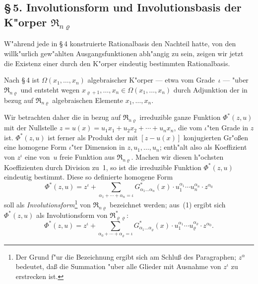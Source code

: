 \documentclass[11pt,a4paper]{article}
\begin{document}
\subsection*{\S\,5. Involutionsform und Involutionsbasis der K"{o}rper $\mathfrak{R}_{n\varrho}$}

W"{a}hrend jede in \S\,4 konstruierte Rationalbasis den Nachteil hatte,
von den willk"{u}rlich gew"{a}hlten Ausgangsfunktionen abh"{a}ngig zu sein, zeigen
wir jetzt die Existenz einer durch den K"{o}rper eindeutig bestimmten
Rationalbasis.

Nach \S\,4 ist $\Omega(x_{1},\dots,x_{n})$ algebraischer K"{o}rper --- etwa vom Grade~$\iota$ ---
"{u}ber $\mathfrak{R}_{n\varrho}$ und entsteht wegen
$x_{\varrho+1},\dots,x_{n}\in\Omega(x_{1},\dots,x_{n})$
durch Adjunktion der in bezug auf $\mathfrak{R}_{n\varrho}$ algebraischen Elemente $x_{1},\dots,x_{n}$.

Wir betrachten daher die in bezug auf $\mathfrak{R}_{n\varrho}$ irreduzible ganze Funktion
$\Phi^{*}(z,u)$ mit der Nullstelle
$z=u(x)=u_{1}x_{1}+u_{2}x_{2}+\cdots+u_{n}x_{n}$,
die vom $\iota$"{t}en Grade in $z$ ist. $\Phi^{*}(z,u)$ ist ferner als Produkt der mit
$[z-u(x)]$ konjugierten Gr"{o}\ss{}en eine homogene Form $\iota$"{t}er Dimension in
$z,u_{1},\dots,u_{n}$; enth"{a}lt also als Koeffizient von $z^{\iota}$ eine von~$u$ freie Funktion
aus $\mathfrak{R}_{n\varrho}$. Machen wir diesen h"{o}chsten Koeffizienten durch Division zu~1,
so ist die irreduzible Funktion $\Phi^{*}(z,u)$ eindeutig bestimmt. Diese so
definierte homogene Form
\begin{equation}
\Phi^{*}(z,u)=z^{\iota}+\sum_{\alpha_{1}+\cdots+\alpha_{n}=\iota}
G_{\alpha_{1}\dots\alpha_{n}}^{*}(x)\cdot u_{1}^{\alpha_{1}}\cdots u_{n}^{\alpha_{n}}\cdot z^{\alpha_{0}}
\tag{1}
\end{equation}
soll als \emph{Involutionsform}\footnote{Der Grund f"{u}r die Bezeichnung ergibt sich
am Schlu\ss{} des Paragraphen; $z^{\alpha}$ bedeutet, da\ss{} die Summation "{u}ber alle Glieder
mit Ausnahme von $z^{\iota}$ zu erstrecken ist.} von $\mathfrak{R}_{n\varrho}$ bezeichnet werden; aus~(1)
ergibt sich $\Phi^{*}(z,u)$ als Involutionsform von $\mathfrak{R}_{\varrho\varrho}^{*}$:
\begin{equation}
\Phi^{*}(z,u)=z^{\iota}+\sum_{\alpha_{0}+\cdots+\alpha_{\varrho}=\iota}
G_{\alpha_{1}\dots\alpha_{\varrho}}^{*}(x)\cdot u_{1}^{\alpha_{1}}\cdots u_{\varrho}^{\alpha_{\varrho}}\cdot z^{\alpha_{0}}.
\tag{2}
\end{equation}
\end{document}
